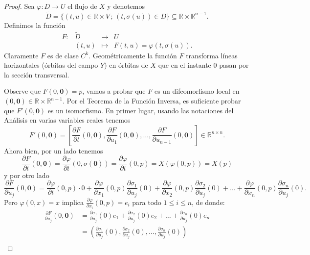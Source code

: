 \documentclass[11pt,a4paper]{article}
\theoremstyle{definition}
\theoremstyle{plain}
\theoremstyle{remark}
\begin{document}
	\begin{proof}
		Sea $\varphi : D \to U$ el flujo de $X$ y denotemos
		\[
		\widetilde{D} = \{(t, u) \in \mathbb{R} \times V \,;\, (t, \sigma(u)) \in D\} \subseteq \mathbb{R} \times \mathbb{R}^{n-1}.
		\]
		Definimos la función
		\[
		\begin{array}{rccc}
			F : & \widetilde{D} & \to & U \\
			& (t, u) & \mapsto & F(t, u) = \varphi(t, \sigma(u)).
		\end{array}
		\]
		Claramente $F$ es de clase $C^k$. Geométricamente la función $F$ transforma líneas horizontales (órbitas del campo $Y$) en órbitas de $X$ que en el instante $0$ pasan por la sección transversal.
		
		Observe que $F(0, \mathbf{0}) = p$, vamos a probar que $F$ es un difeomorfismo local en $(0, \mathbf{0}) \in \mathbb{R} \times \mathbb{R}^{n-1}$. Por el Teorema de la Función Inversa, es suficiente probar que $F'(0, \mathbf{0})$ es un isomorfismo. En primer lugar, usando las notaciones del Análisis en varias variables reales tenemos
		\begin{equation}\label{eq:71}
			F'(0, \mathbf{0}) = \left[ \frac{\partial F}{\partial t}(0, \mathbf{0}), \frac{\partial F}{\partial u_1}(0, \mathbf{0}), \dots, \frac{\partial F}{\partial u_{n-1}}(0, \mathbf{0}) \right] \in \mathbb{R}^{n \times n}.
		\end{equation}
		Ahora bien, por un lado tenemos
		\[
		\frac{\partial F}{\partial t}(0, \mathbf{0}) = \frac{\partial \varphi}{\partial t}(0, \sigma(\mathbf{0})) = \frac{\partial \varphi}{\partial t}(0, p) = X(\varphi(0, p)) = X(p)
		\]
		y por otro lado
		\[
		\frac{\partial F}{\partial u_j}(0, \mathbf{0}) = \frac{\partial \varphi}{\partial t}(0, p) \cdot 0 + \frac{\partial \varphi}{\partial x_1}(0, p) \frac{\partial \sigma_1}{\partial u_j}(0) + \frac{\partial \varphi}{\partial x_2}(0, p) \frac{\partial \sigma_2}{\partial u_j}(0) + \dots + \frac{\partial \varphi}{\partial x_n}(0, p) \frac{\partial \sigma_n}{\partial u_j}(0).
		\]
		Pero $\varphi(0, x) = x$ implica $\frac{\partial \varphi}{\partial x_i}(0, p) = e_i$ para todo $1 \le i \le n$, de donde:
		\[
		\begin{aligned}
			\frac{\partial F}{\partial u_j}(0, \mathbf{0}) &= \frac{\partial \sigma_1}{\partial u_j}(0) e_1 + \frac{\partial \sigma_2}{\partial u_j}(0) e_2 + \dots + \frac{\partial \sigma_n}{\partial u_j}(0) e_n \\
			&= \left( \frac{\partial \sigma_1}{\partial u_j}(0), \frac{\partial \sigma_2}{\partial u_j}(0), \dots, \frac{\partial \sigma_n}{\partial u_j}(0) \right) \\

\end{aligned}\]
\end{proof}
\end{document}
